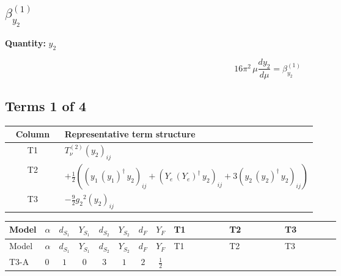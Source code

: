 \documentclass[8pt]{article}
\begin{document}
\begin{landscape}
\section*{$\beta_{y_2}^{(1)}$}
\noindent\textbf{Quantity: }$y_2$\par\smallskip
\[16\pi^2\,\mu\frac{d y_2}{d\mu}=\beta_{y_2}^{(1)}\]
\subsection*{Terms 1 of 4}
\begin{center}
\begin{tabular}{@{}c >{\raggedright\arraybackslash}p{0.82\linewidth}@{}}
\toprule
Column & Representative term structure \\
\midrule
T1 & \(\displaystyle T_{\nu}^{(2)} \left({y_2}\right)_{ij}\) \\
\midrule
T2 & \(\displaystyle +\frac{1}{2} (\left({y_1}\,\left({y_1}\right)^{\dagger}\,{y_2}\right)_{ij}+\left({Y_e}\,\left({Y_e}\right)^{\dagger}\,{y_2}\right)_{ij}+3 \left({y_2}\,\left({y_2}\right)^{\dagger}\,{y_2}\right)_{ij})\) \\
\midrule
T3 & \(\displaystyle -\frac{9}{2} {g_2}^2 \left({y_2}\right)_{ij}\) \\
\midrule
\bottomrule
\end{tabular}
\end{center}
\smallskip
\tiny
\begin{longtable}{@{}llcccccc >{\raggedright\arraybackslash}p{0.21\linewidth} >{\raggedright\arraybackslash}p{0.21\linewidth} >{\raggedright\arraybackslash}p{0.21\linewidth}@{}}
\toprule
Model & $\alpha$ & $d_{S_1}$ & $Y_{S_1}$ & $d_{S_2}$ & $Y_{S_2}$ & $d_F$ & $Y_F$ & T1 & T2 & T3 \\
\midrule
\endfirsthead
\toprule
Model & $\alpha$ & $d_{S_1}$ & $Y_{S_1}$ & $d_{S_2}$ & $Y_{S_2}$ & $d_F$ & $Y_F$ & T1 & T2 & T3 \\
\midrule
\endhead
T3-A & $0$ & $1$ & $0$ & $3$ & $1$ & $2$ & $\frac{1}{2}$ & \scriptsize\adjustbox{max width=\linewidth}{$\begin{gathered} T_{\nu}^{(2)} \left({y_2}\right)_{ij}\end{gathered}$} & \scriptsize\adjustbox{max width=\linewidth}{$\begin{gathered} +\frac{1}{2} (\left({y_1}\,\left({y_1}\right)^{\dagger}\,{y_2}\right)_{ij}+\left({Y_e}\,\left({Y_e}\right)^{\dagger}\,{y_2}\right)_{ij}+3 \left({y_2}\,\left({y_2}\right)^{\dagger}\,{y_2}\right)_{ij})\end{gathered}$} & \scriptsize\adjustbox{max width=\linewidth}{$\begin{gathered} -\frac{9}{2} {g_2}^2 \left({y_2}\right)_{ij}\end{gathered}$} \\

\end{longtable}
\end{landscape}
\end{document}
